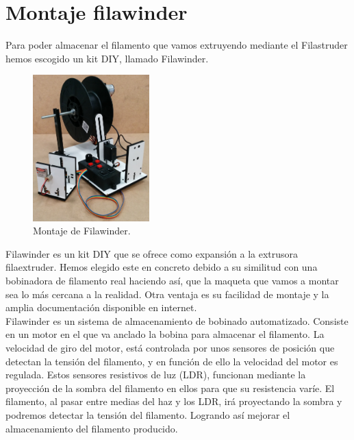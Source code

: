 \chapter{Montaje filawinder}
\label{ane:filawinder}
Para poder almacenar el filamento que vamos extruyendo mediante el Filastruder hemos escogido un kit DIY, llamado Filawinder\cite{filawinder}. 

    \begin{figure}[H]
            \centering
            \includegraphics[width=0.4\textwidth]{images/filawinder/IMG_20150313_103643.jpg}
            \caption{Montaje de Filawinder.}
            \label{fig:winder_winder}
    \end{figure}

Filawinder es un kit DIY que se ofrece como expansión a la extrusora  filaextruder. Hemos elegido este en concreto debido a su similitud con una bobinadora de filamento real haciendo así, que la maqueta que vamos a montar sea lo más cercana a la realidad. Otra ventaja es su facilidad de montaje y la amplia documentación disponible en internet.\\

Filawinder es un sistema de almacenamiento de bobinado automatizado. Consiste en un motor en el que va anclado la bobina para almacenar el filamento. La velocidad de giro del motor, está controlada por unos sensores de posición que detectan la tensión del filamento, y en función de ello la velocidad del motor es regulada. Estos sensores resistivos de luz (LDR), funcionan mediante la proyección de la sombra del filamento en ellos para que su resistencia varíe. El filamento, al pasar entre medias del haz y los LDR, irá proyectando la sombra y podremos detectar la tensión del filamento. Logrando así mejorar el almacenamiento del filamento producido.

